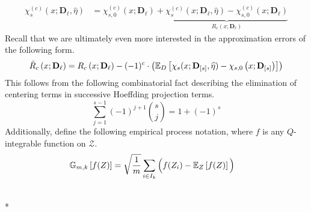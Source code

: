 \begin{equation}
    \begin{aligned}
        \chi_{s}^{(c)}\left(x; \mathbf{D}_{\ell}, \hat{\eta}\right)
        & = \chi_{s,0}^{(c)}\left(x; \mathbf{D}_{\ell}\right) + \underbrace{\chi_{s}^{(c)}\left(x; \mathbf{D}_{\ell}, \hat{\eta}\right) - \chi_{s,0}^{(c)}\left(x; \mathbf{D}_{\ell}\right)}_{R_{c}\left(x; \mathbf{D}_{\ell}\right)}
    \end{aligned}
\end{equation}
Recall that we are ultimately even more interested in the approximation errors of the following form.
\begin{equation}
    \tilde{R}_{c}\left(x; \mathbf{D}_{\ell}\right)
     = R_{c}\left(x; \mathbf{D}_{\ell}\right) - (-1)^{c} \cdot \left(\mathbb{E}_{D}\left[\chi_{s}(x; \mathbf{D}_{[s]}, \widehat{\eta}) - \chi_{s,0}\left(x; \mathbf{D}_{[s]}\right)\right]\right)
\end{equation}
This follows from the following combinatorial fact describing the elimination of centering terms in successive Hoeffding projection terms.
\begin{equation}
    \sum_{j = 1}^{s-1}(-1)^{j+1} \binom{s}{j} = 1 + (-1)^{s}
\end{equation}
Additionally, define the following empirical process notation, where $f$ is any $Q$-integrable function on $\mathcal{Z}$.
\begin{equation}
    \begin{aligned}
        \mathbb{G}_{m,k}\left[f(Z)\right]
        & = \sqrt{\frac{1}{m}} \sum_{i \in I_{k}} \Big(f(Z_i) - \mathbb{E}_{Z}\left[f(Z)\right]\Big)
    \end{aligned}
\end{equation}
    
\newpage

\begin{lem}\label{lem:fs_approx_error}\mbox{}\\*
    
\end{lem}

